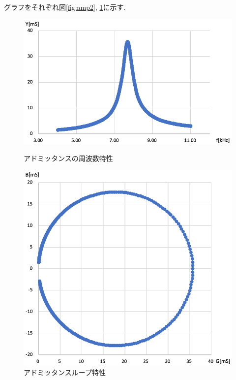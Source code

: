 \documentclass[titlepage]{jsarticle}
\begin{document}
                グラフをそれぞれ図\ref{fig:amp2}, \ref{fig:loop}に示す.

                \begin{figure}[h]
                    \begin{minipage}{0.5\hsize}
                        \centering
                        \includegraphics[width=1\hsize]{images/amp2.png}
                        \caption{アドミッタンスの周波数特性}
                        \label{fig:amp2}
                    \end{minipage}
                    \begin{minipage}{0.5\hsize}
                        \centering
                        \includegraphics[width=0.9\hsize]{images/loop.png}
                        \caption{アドミッタンスループ特性}
                        \label{fig:loop}
                    \end{minipage}
                \end{figure}
\end{document}
